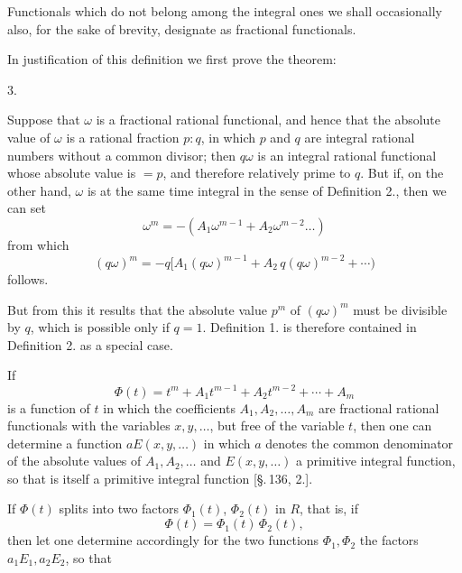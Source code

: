 
Functionals which do not belong among the integral ones we shall occasionally also, for the sake of brevity, designate as fractional functionals.

In justification of this definition we first prove the theorem:

3. 

Suppose that $\omega$ is a fractional rational functional, and hence that the absolute value of $\omega$ is a rational fraction $p:q$, in which $p$ and $q$ are integral rational numbers without a common divisor; then $q\omega$ is an integral rational functional whose absolute value is $=p$, and therefore relatively prime to $q$. But if, on the other hand, $\omega$ is at the same time integral in the sense of Definition 2., then we can set
\[
\omega^m = -(A_1\omega^{m-1} + A_2\omega^{m-2} \ldots)
\]
from which
\[
(q\omega)^m = -q[A_1(q\omega)^{m-1} + A_2\,q(q\omega)^{m-2} + \cdots) %
\]
follows.

But from this it results that the absolute value $p^m$ of $(q\omega)^m$ must be divisible by $q$, which is possible only if $q=1$. Definition 1. is therefore contained in Definition 2. as a special case.

If
\[
\Phi(t) = t^m + A_1t^{m-1} + A_2t^{m-2} + \cdots + A_m
\]
is a function of $t$ in which the coefficients $A_1, A_2, \ldots, A_m$ are fractional rational functionals with the variables $x, y, \ldots$, but free of the variable $t$, then one can determine a function $aE(x,y,\ldots)$ in which $a$ denotes the common denominator of the absolute values of $A_1, A_2, \ldots$ and $E(x,y,\ldots)$ a primitive integral function, so that
is itself a primitive integral function [§.\,136, 2.].

If $\Phi(t)$ splits into two factors $\Phi_1(t)$, $\Phi_2(t)$ in $R$, that is, if
\[
\Phi(t) = \Phi_1(t)\,\Phi_2(t),
\]
then let one determine accordingly for the two functions $\Phi_1, \Phi_2$ the factors $a_1E_1, a_2E_2$, so that
